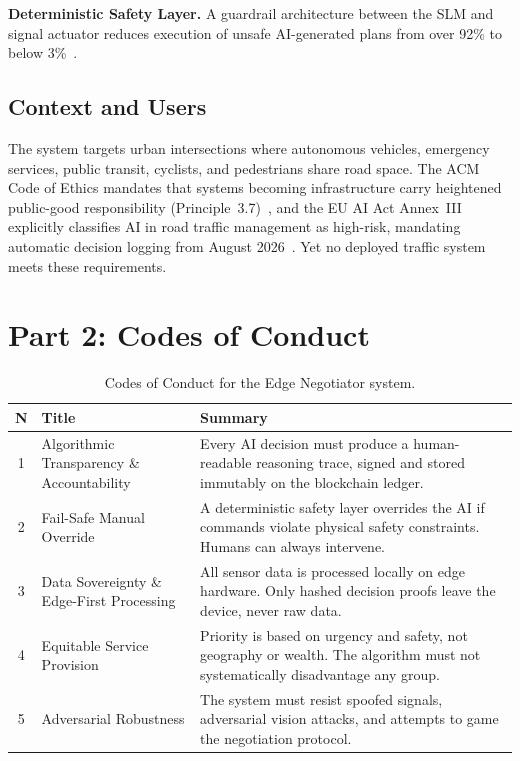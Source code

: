 \documentclass[sigconf,nonacm]{acmart}
\begin{document}
\textbf{Deterministic Safety Layer.} A guardrail architecture between the SLM and signal actuator reduces execution of unsafe AI-generated plans from over 92\% to below 3\%~\cite{roboguard}.

\subsection{Context and Users}

The system targets urban intersections where autonomous vehicles, emergency services, public transit, cyclists, and pedestrians share road space. The ACM Code of Ethics mandates that systems becoming infrastructure carry heightened public-good responsibility (Principle~3.7)~\cite{acmcode}, and the EU AI Act Annex~III explicitly classifies AI in road traffic management as high-risk, mandating automatic decision logging from August 2026~\cite{euaiact}. Yet no deployed traffic system meets these requirements.

\section{Part 2: Codes of Conduct}

\begin{table}[h]
  \caption{Codes of Conduct for the Edge Negotiator system.}
  \label{tab:codes}
  \small
  \begin{tabular}{c p{1.8cm} p{4.2cm}}
    \toprule
    N & Title & Summary \\
    \midrule
    1 & Algorithmic Transparency \& Accountability & Every AI decision must produce a human-readable reasoning trace, signed and stored immutably on the blockchain ledger. \\
    2 & Fail-Safe Manual Override & A deterministic safety layer overrides the AI if commands violate physical safety constraints. Humans can always intervene. \\
    3 & Data Sovereignty \& Edge-First Processing & All sensor data is processed locally on edge hardware. Only hashed decision proofs leave the device, never raw data. \\
    4 & Equitable Service Provision & Priority is based on urgency and safety, not geography or wealth. The algorithm must not systematically disadvantage any group. \\
    5 & Adversarial Robustness & The system must resist spoofed signals, adversarial vision attacks, and attempts to game the negotiation protocol. \\
    \bottomrule
  \end{tabular}
\end{table}
\end{document}
